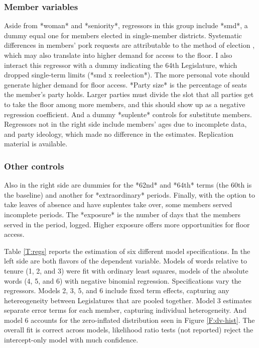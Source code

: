 \documentclass[letter,12pt]{article}
\begin{document}
    \subsubsection{Member variables}

Aside from *woman* and *seniority*, regressors in this group include *smd*, a dummy equal one for members elected in single-member districts. Systematic differences in members' pork requests are attributable to the method of election \citep{kerevelPork2015}, which may also translate into higher demand for access to the floor. I also interact this regressor with a dummy indicating the 64th Legislature, which dropped single-term limits (*smd x reelection*). The more personal vote should generate higher demand for floor access. *Party size* is the percentage of seats the member's party holds. Larger parties must divide the slot that all parties get to take the floor among more members, and this should show up as a negative regression coefficient. And a dummy *suplente* controls for substitute members. Regressors not in the right side include members' ages due to incomplete data, and party ideology, which made no difference in the estimates. Replication material is available. 

    \subsubsection{Other controls}

Also in the right side are dummies for the *62nd* and *64th* terms (the 60th is the baseline) and another for *extraordinary* periods. Finally, with the option to take leaves of absence and have suplentes take over, some members served incomplete periods. The *exposure* is the number of days that the members served in the period, logged. Higher exposure offers more opportunities for floor access. 


Table \ref{T:regs} reports the estimation of six different model specifications. In the left side are both flavors of the dependent variable. Models of words relative to tenure (1, 2, and 3) were fit with ordinary least squares, models of the absolute words (4, 5, and 6) with negative binomial regression. Specifications vary the regressors. Models 2, 3, 5, and 6 include fixed term effects, capturing any hetereogeneity between Legislatures that are pooled together. Model 3 estimates separate error terms for each member, capturing individual heterogeneity. And model 6 accounts for the zero-inflated  distribution seen in Figure \ref{F:dv-hist}. The overall fit is correct across models, likelihood ratio tests (not reported) reject the intercept-only model with much confidence. 
\end{document}

